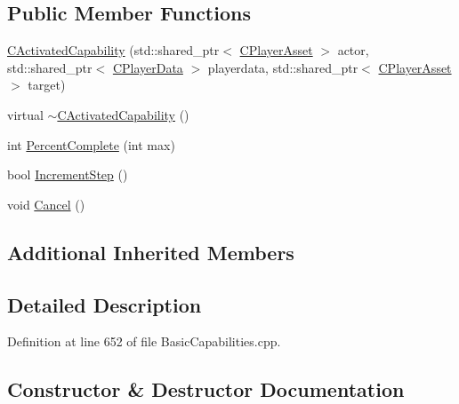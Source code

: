 \subsection*{Public Member Functions}
\begin{DoxyCompactItemize}
\item 
\hyperlink{classCPlayerCapabilityAttack_1_1CActivatedCapability_aa564d203e407b40f008d19a65f01d823}{C\+Activated\+Capability} (std\+::shared\+\_\+ptr$<$ \hyperlink{classCPlayerAsset}{C\+Player\+Asset} $>$ actor, std\+::shared\+\_\+ptr$<$ \hyperlink{classCPlayerData}{C\+Player\+Data} $>$ playerdata, std\+::shared\+\_\+ptr$<$ \hyperlink{classCPlayerAsset}{C\+Player\+Asset} $>$ target)
\item 
virtual \hyperlink{classCPlayerCapabilityAttack_1_1CActivatedCapability_a8524b57d63ce6e899630ef56326be98b}{$\sim$\+C\+Activated\+Capability} ()
\item 
int \hyperlink{classCPlayerCapabilityAttack_1_1CActivatedCapability_a75866109b62de0522622b03137461519}{Percent\+Complete} (int max)
\item 
bool \hyperlink{classCPlayerCapabilityAttack_1_1CActivatedCapability_a6b772cbd6be96fbd9bf88380b143856c}{Increment\+Step} ()
\item 
void \hyperlink{classCPlayerCapabilityAttack_1_1CActivatedCapability_a0796fbda8a35b60a2320becfdf2b5c13}{Cancel} ()
\end{DoxyCompactItemize}
\subsection*{Additional Inherited Members}


\subsection{Detailed Description}


Definition at line 652 of file Basic\+Capabilities.\+cpp.



\subsection{Constructor \& Destructor Documentation}
\hypertarget{classCPlayerCapabilityAttack_1_1CActivatedCapability_aa564d203e407b40f008d19a65f01d823}{}\label{classCPlayerCapabilityAttack_1_1CActivatedCapability_aa564d203e407b40f008d19a65f01d823} 
